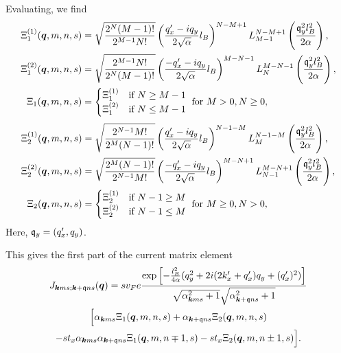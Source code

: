 Evaluating, we find
\begin{align}
  \Xi_1 ^{(1)}(\bm{q}, m, n, s) &= \sqrt{\frac{2^N (M-1)!}{2^{M-1} N!}}
                                   \left( \frac{q'_x - iq_y}{2 \sqrt{\alpha } } l_B \right)^{N-M + 1}
                                   L^{N-M+1}_{M-1} \left( \frac{\mathfrak{q}_y^2 l_B^2}{2 \alpha } \right),\\
  \Xi_1 ^{(2)}(\bm{q}, m, n, s) &= \sqrt{\frac{2^{M-1} N!}{2^N (M-1)!}}
                                   \left( \frac{-q'_x - iq_y}{2 \sqrt{\alpha } } l_B \right)^{M-N - 1}
                                   L^{M - N - 1}_N \left( \frac{\mathfrak{q}_y^2 l_B^2}{2 \alpha } \right),\\
  \Xi_1(\bm{q}, m, n, s) &=
          \begin{cases}
            \Xi _1 ^{(1)} & \text{if } N \geq M-1\\
            \Xi _1 ^{(2)} & \text{if } N \leq M-1
          \end{cases} \text{ for } M>0, N \geq 0,
\end{align}
\begin{align}
  \Xi_2 ^{(1)}(\bm{q}, m, n, s) &= \sqrt{\frac{2^{N-1} M!}{2^M (N-1)!}}
                                   \left( \frac{q'_x - iq_y}{2 \sqrt{\alpha }} l_B \right)^{N-1 - M}
                                   L^{N-1 -M}_{M} \left( \frac{\mathfrak{q}_y^2 l_B^2}{2 \alpha } \right),\\
  \Xi_2 ^{(2)}(\bm{q}, m, n, s) &= \sqrt{\frac{2^M (N-1)!}{2^{N-1} M!}}
                                   \left( \frac{-q'_x - iq_y}{2 \sqrt{\alpha }} l_B \right)^{M-N + 1}
                                   L^{M - N + 1}_{N-1} \left( \frac{\mathfrak{q}_y^2 l_B^2}{2 \alpha } \right),\\
  \Xi_2(\bm{q}, m, n, s) &=
          \begin{cases}
            \Xi _2 ^{(1)} & \text{if } N-1 \geq M\\
            \Xi _2 ^{(2)} & \text{if } N-1 \leq M
          \end{cases} \text{ for } M\geq 0, N > 0,
\end{align}
Here, \( \mathfrak{q}_y = (q'_x, q_y) \).

This gives the first part of the current matrix element
\begin{multline}
  J_{\bm{k} m s; \bm{k} + \mathfrak{q} n s} (\bm{q}) =
  s v_{F} e
  \frac{
    \exp \left[
      -\frac{l_{B}^2}{4 \alpha } (q_{y}^2 + 2i (2 k'_x + q'_x) q_{y} + (q'_x)^2 )
    \right]
  }{
    \sqrt{\alpha _{\bm{k} m s}^2 + 1} \sqrt{ \alpha _{\bm{k} + \mathfrak{q} n s}^2 + 1 }
  } \\
  \Big[
   \alpha _{\bm{k} m s} \Xi_{1} (\bm{q}, m, n, s)
    + \alpha _{\bm{k} + \mathfrak{q} n s} \Xi _{2} (\bm{q}, m, n, s)\\
    -s t_x \alpha _{\bm{k} m s} \alpha _{\bm{k} + \mathfrak{q} n s} \Xi _1(\bm{q}, m, n\mp 1, s)
    -s t_x \Xi _2(\bm{q}, m, n\pm 1, s)
  \Big].
\end{multline}


